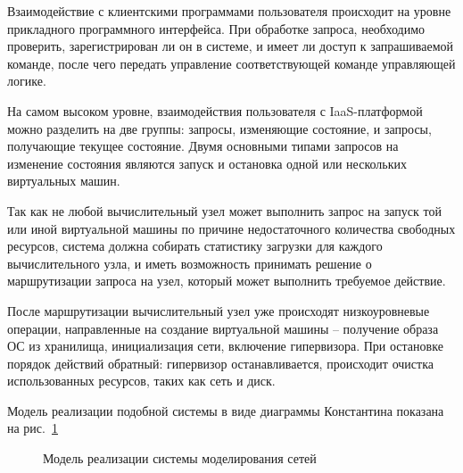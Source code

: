 Взаимодействие с клиентскими программами пользователя происходит на уровне прикладного 
программного интерфейса. При обработке запроса, необходимо проверить, зарегистрирован
ли он в системе, и имеет ли доступ к запрашиваемой команде, после чего передать управление
соответствующей команде управляющей логике.

На самом высоком уровне, взаимодействия пользователя с IaaS-платформой можно разделить на
две группы: запросы, изменяющие состояние, и запросы, получающие текущее состояние.
Двумя основными типами запросов на изменение состояния являются запуск и остановка
одной или нескольких виртуальных машин.

Так как не любой вычислительный узел может выполнить запрос на запуск той или иной
виртуальной машины по причине недостаточного количества свободных ресурсов,
система должна собирать статистику загрузки для каждого вычислительного узла,
и иметь возможность принимать решение о маршрутизации запроса на узел, который может 
выполнить требуемое действие.

После маршрутизации вычислительный узел уже происходят низкоуровневые операции, 
направленные на создание виртуальной машины -- получение образа ОС из хранилища, 
инициализация сети, включение гипервизора. 
При остановке порядок действий обратный: гипервизор останавливается, происходит 
очистка использованных ресурсов, таких как сеть и диск.

Модель реализации подобной системы в виде диаграммы Константина показана на
 рис.~\ref{fig:iaas-lowlevel}
\begin{figure}
  \centering
  {\footnotesize}
  \caption{Модель реализации системы моделирования сетей}
  \label{fig:iaas-lowlevel}
\end{figure} 
